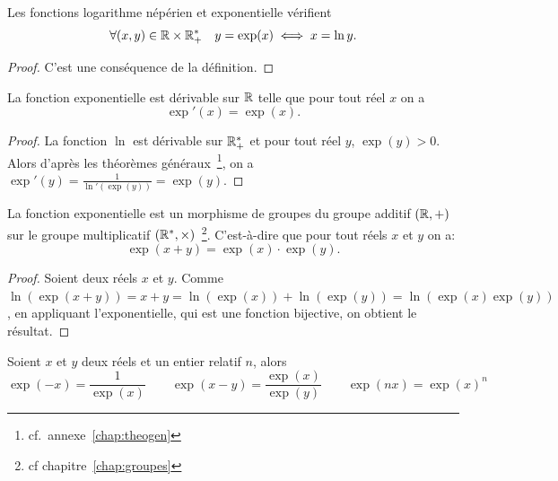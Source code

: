 \begin{prop}
  Les fonctions logarithme népérien et exponentielle vérifient
  \begin{equation}
    \forall (x,y) \in \mathbb{R} \times \mathbb{R}_{+}^{*} \quad y = \exp(x) \iff x = \ln y.
  \end{equation}
\end{prop}

\begin{proof}
  C'est une conséquence de la définition.
\end{proof}

\begin{prop}
  La fonction exponentielle est dérivable sur \(\mathbb{R}\) telle que pour tout réel
  \(x\) on a
  \begin{equation}
    \exp' (x) = \exp(x).
  \end{equation}
\end{prop}

\begin{proof}
  La fonction \(\ln\) est dérivable sur \(\mathbb{R}_{+}^{*}\) et pour tout réel
  \(y\), \(\exp(y)>0\). Alors d'après les théorèmes généraux~\footnote{cf.\
  annexe~\ref{chap:theogen}}, on a \(\exp'(y) = \frac{1}{\ln'(\exp(y))} =
  \exp(y)\).
\end{proof}

\begin{prop}\label{prop-chap1:addexp}
  La fonction exponentielle est un morphisme de groupes du groupe additif
  \((\mathbb{R},+)\) sur le groupe multiplicatif \((\mathbb{R}^*,\times)\)~\footnote{cf
  chapitre~\ref{chap:groupes}}. C'est-à-dire que pour tout réels \(x\) et
  \(y\) on a:
  \begin{equation}
    \exp(x+y) = \exp(x)\cdot\exp(y).
  \end{equation}
\end{prop}

\begin{proof}
  Soient deux réels \(x\) et \(y\). Comme \(\ln(\exp(x+y)) = x+y =
  \ln(\exp(x))+\ln(\exp(y)) = \ln(\exp(x) \exp(y))\), en appliquant
  l'exponentielle, qui est une fonction bijective, on obtient le résultat.
\end{proof}

\begin{cor}
  Soient \(x\) et \(y\) deux réels et un entier relatif \(n\), alors
  \begin{equation}
    \exp(-x) = \frac{1}{\exp(x)} \qquad \exp(x-y) = \frac{\exp(x)}{\exp(y)}
    \qquad \exp(nx) = {\exp(x)}^n
  \end{equation}
\end{cor}

